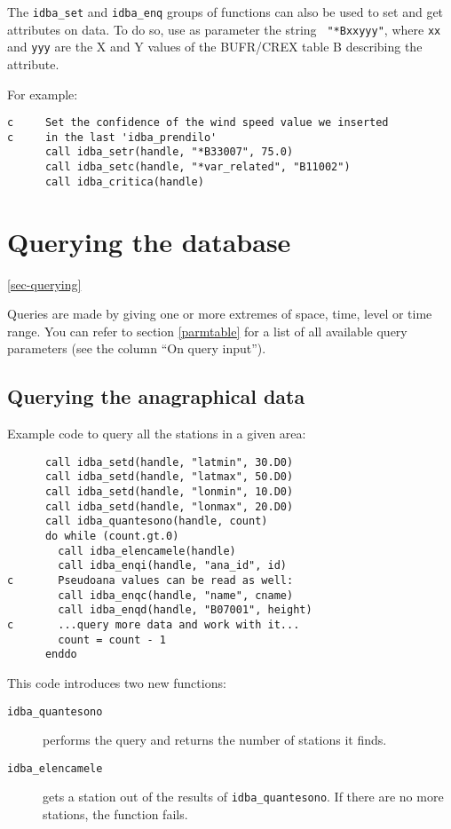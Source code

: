 \documentclass[final,12pt,a4paper,twoside]{book}
\begin{document}
\label{sec-attrs}

The {\tt idba\_set} and {\tt idba\_enq} groups of functions can also be used to
set and get attributes on data.  To do so, use as parameter the string {\tt
"*Bxxyyy"}, where {\tt xx} and {\tt yyy} are the X and Y values of the
BUFR/CREX table B describing the attribute.

For example:

\begin{verbatim}
c     Set the confidence of the wind speed value we inserted
c     in the last 'idba_prendilo'
      call idba_setr(handle, "*B33007", 75.0)
      call idba_setc(handle, "*var_related", "B11002")
      call idba_critica(handle)
\end{verbatim}

\section {Querying the database}

\ref{sec-querying}

Queries are made by giving one or more extremes of space, time, level or time
range.  You can refer to section \ref{parmtable} for a list of all available
query parameters (see the column ``On query input'').

\subsection {Querying the anagraphical data}

Example code to query all the stations in a given area:
\label{fun-idba_quantesono}
\label{fun-idba_elencamele}

\begin{verbatim}
      call idba_setd(handle, "latmin", 30.D0)
      call idba_setd(handle, "latmax", 50.D0)
      call idba_setd(handle, "lonmin", 10.D0)
      call idba_setd(handle, "lonmax", 20.D0)
      call idba_quantesono(handle, count)
      do while (count.gt.0)
        call idba_elencamele(handle)
        call idba_enqi(handle, "ana_id", id)
c       Pseudoana values can be read as well:
        call idba_enqc(handle, "name", cname)
        call idba_enqd(handle, "B07001", height)
c       ...query more data and work with it...
        count = count - 1
      enddo
\end{verbatim}

This code introduces two new functions:

\begin{description}
\item[{\tt idba\_quantesono}]
  performs the query and returns the number of stations it finds.

\item[{\tt idba\_elencamele}]
  gets a station out of the results of {\tt idba\_quantesono}.  If there are no
  more stations, the function fails.
\end{description}
\end{document}
